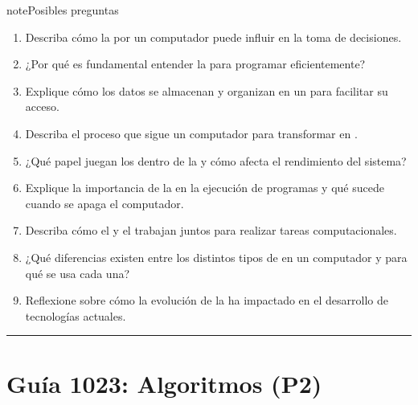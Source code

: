 \documentclass[letterpaper,10pt,spanish]{sphinxmanual}
\begin{document}
\begin{sphinxadmonition}{note}{Posibles preguntas}
\begin{enumerate}
\item {} 
\sphinxAtStartPar
Describa cómo la  por un computador puede influir en la toma de decisiones.

\item {} 
\sphinxAtStartPar
¿Por qué es fundamental entender la  para programar eficientemente?

\item {} 
\sphinxAtStartPar
Explique cómo los datos se almacenan y organizan en un  para facilitar su acceso.

\item {} 
\sphinxAtStartPar
Describa el proceso que sigue un computador para transformar  en .

\item {} 
\sphinxAtStartPar
¿Qué papel juegan los  dentro de la  y cómo afecta el rendimiento del sistema?

\item {} 
\sphinxAtStartPar
Explique la importancia de la  en la ejecución de programas y qué sucede cuando se apaga el computador.

\item {} 
\sphinxAtStartPar
Describa cómo el  y el  trabajan juntos para realizar tareas computacionales.

\item {} 
\sphinxAtStartPar
¿Qué diferencias existen entre los distintos tipos de  en un computador y para qué se usa cada una?

\item {} 
\sphinxAtStartPar
Reflexione sobre cómo la evolución de la  ha impactado en el desarrollo de tecnologías actuales.

\end{enumerate}
\end{sphinxadmonition}


\bigskip\hrule\bigskip


\sphinxstepscope


\section{Guía 1023: Algoritmos (P2)}
\label{\detokenize{1_guias/10programacion/G1023:guia-1023-algoritmos-p2}}\label{\detokenize{1_guias/10programacion/G1023::doc}}
\end{document}
